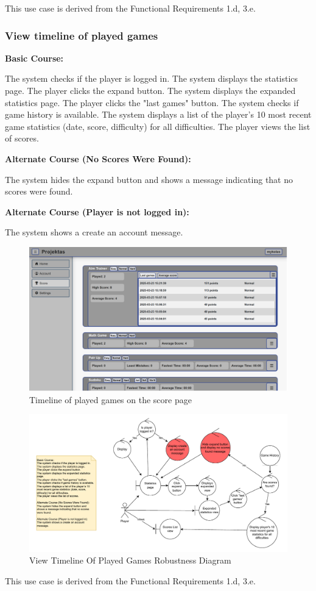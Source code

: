 \documentclass[11pt,a4paper]{article}
\newcommand{\heading}[1]{\vspace{1em}\noindent\textbf{#1}\par\vspace{0.5em}}
\begin{document}
This use case is derived from the Functional Requirements 1.d, 3.e.

\subsubsection{View timeline of played games}


\heading{Basic Course:}
The system checks if the player is logged in. The system displays the statistics page. The player clicks the expand button. The system displays the expanded statistics page. The player clicks the "last games" button. The system checks if game history is available. The system displays a list of the player’s 10 most recent game statistics (date, score, difficulty) for all difficulties. The player views the list of scores.

\heading{Alternate Course (No Scores Were Found):}
The system hides the expand button and shows a message indicating that no scores were found.

\heading{Alternate Course (Player is not logged in):}
The system shows a create an account message.

\begin{figure}[H]
    \centering
    \includegraphics[width=1\textwidth,keepaspectratio]{PSI_3rd_trial/PNGs/timeline_of_played_games.png}
    \caption{Timeline of played games on the score page}
    \label{fig:timeline_of_played_games}
\end{figure}

\begin{figure}[H]
    \centering
    \includegraphics[width=1\textwidth,keepaspectratio]{PSI_3rd_trial/robustness/scores_list.drawio.pdf}
    \caption{View Timeline Of Played Games Robustness Diagram}
    \label{fig:statistics_timeline_view_diagram}
\end{figure}

This use case is derived from the Functional Requirements 1.d, 3.e.

\end{document}
